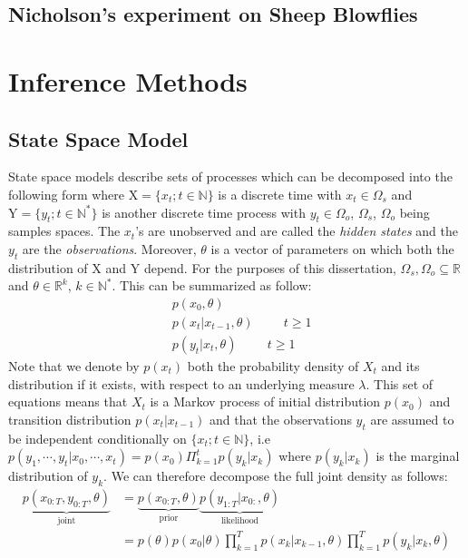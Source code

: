 \documentclass{article}
\begin{document}
	\subsection{Nicholson's experiment on Sheep Blowflies}
	
	\clearpage
	\section{Inference Methods}
	\subsection{State Space Model}
	State space models describe sets of processes which can be decomposed into the following form where $\mathrm{X}=\{x_t ; t \in \mathbb{N}\}$ is a discrete time with $x_t \in \Omega_s$ and $\mathrm{Y}=\{y_t ; t \in \mathbb{N^*}\}$ is another discrete time process with $y_t \in \Omega_o$, $\Omega_s$, $\Omega_o$ being samples spaces. The $x_t$'s are unobserved and are called the \emph{hidden states} and the $y_t$ are the \emph{observations}. Moreover, $\theta$ is a vector of parameters on which both the distribution of $\mathrm{X}$ and $\mathrm{Y}$ depend. For the purposes of this dissertation, $\Omega_s, \Omega_o \subseteq \mathbb{R}$ and $\theta \in \mathbb{R}^k$, $k \in \mathbb{N^*}$. This can be summarized as follow: 
	\begin{align}
		& p(x_0, \theta) \\
		& p(x_t | x_{t-1}, \theta) \hspace{1cm} t \ge 1\\
		& p(y_t | x_t, \theta) \hspace{1cm} t \ge 1
	\end{align}
	Note that we denote by $p(x_t)$ both the probability density of $X_t$ and its distribution if it exists, with respect to an underlying measure $\lambda$. This set of equations means that $X_t$ is a Markov process of initial distribution $p(x_0)$ and transition distribution $p(x_t | x_{t-1})$ and that the observations $y_t$ are assumed to be independent conditionally on $\{x_t ; t \in \mathbb{N}\}$, i.e $p(y_1, \cdots, y_t | x_0, \cdots, x_t) =p(x_0)\Pi_{k=1}^t p(y_k | x_k)$ where $p(y_k | x_k)$ is the marginal distribution of $y_k$. We can therefore decompose the full joint density as follows:
	\begin{align}
	\underbrace{p(x_{0:T}, y_{0:T}, \theta)}_{\text{joint}} & = \underbrace{p(x_{0:T}, \theta)}_{\text{prior}}\underbrace{p(y_{1:T}| x_{0:}, \theta)}_{\text{likelihood}} \\
		& = p(\theta)p(x_0| \theta)\prod_{k=1}^{T}p(x_k|x_{k-1}, \theta)\prod_{k=1}^{T}p(y_k|x_k, \theta)
	\end{align}\\
	
\end{document}
